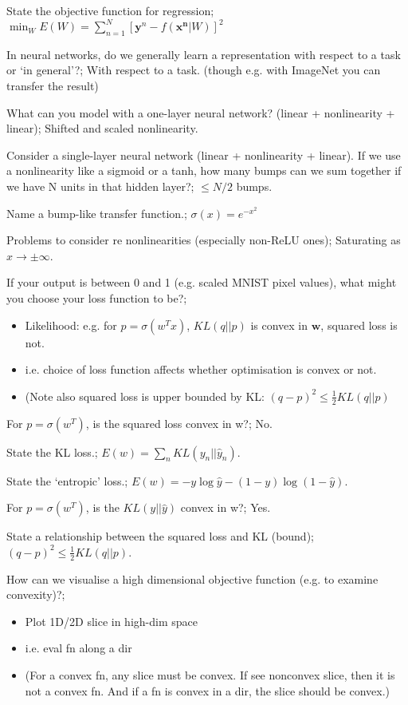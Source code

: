 \documentclass{article}
\begin{document}
State the objective function for regression; $\min_W E(W) = \sum_{n=1}^N [\mathbf{y}^n - f(\mathbf{x^n}|W)]^2$

In neural networks, do we generally learn a representation with respect to a task or `in general'?; With respect to a task. (though e.g. with ImageNet you can transfer the result)

What can you model with a one-layer neural network? (linear + nonlinearity + linear); Shifted and scaled nonlinearity.

Consider a single-layer neural network (linear + nonlinearity + linear).  If we use a nonlinearity like a sigmoid or a tanh, how many bumps can we sum together if we have N units in that hidden layer?; $\leq N/2$ bumps.

Name a bump-like transfer function.; $\sigma(x) = e^{-x^2}$

Problems to consider re nonlinearities (especially non-ReLU ones); Saturating as $x\rightarrow \pm\infty$.

If your output is between 0 and 1 (e.g. scaled MNIST pixel values), what might you choose your loss function to be?; \begin{itemize}
    \item Likelihood: e.g. for $p=\sigma(w^Tx)$, $KL(q||p)$ is convex in $\mathbf{w}$, squared loss is not.
    \item i.e. choice of loss function affects whether optimisation is convex or not.
    \item (Note also squared loss is upper bounded by KL: $(q-p)^2 \leq \frac{1}{2}KL(q||p)$
\end{itemize}

For $p=\sigma(w^T)$, is the squared loss convex in w?; No.

State the KL loss.; $E(w) = \sum_n KL(y_n||\hat{y}_n)$.

State the `entropic' loss.; $E(w) = -y\log\hat{y} - (1-y)\log(1-\hat{y})$.

For $p=\sigma(w^T)$, is the $KL(y||\hat{y})$ convex in w?; Yes.

State a relationship between the squared loss and KL (bound); $(q-p)^2 \leq \frac{1}{2}KL(q||p)$.

How can we visualise a high dimensional objective function (e.g. to examine convexity)?; \begin{itemize}
    \item Plot 1D/2D slice in high-dim space
    \item i.e. eval fn along a dir
    \item (For a convex fn, any slice must be convex. If see nonconvex slice, then it is not a convex fn. And if a fn is convex in a dir, the slice should be convex.)
\end{itemize}
\end{document}

